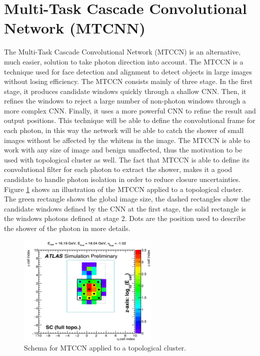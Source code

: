 \section{Multi-Task Cascade Convolutional Network (MTCNN)}

The Multi-Task Cascade Convolutional Network (MTCCN) is an alternative, much easier, solution to take photon direction into account. The MTCCN is a technique used for face detection and alignment to detect objects in large images without losing efficiency. The MTCCN consists mainly of three stage. In the first stage, it produces candidate windows quickly through a shallow CNN. Then,  it  refines the windows to reject a large number of non-photon windows through a more complex CNN. Finally, it uses a more powerful CNN to refine the result and output positions. This technique will be able to define the convolutional frame for each photon, in this way the network will be able to catch the shower of small images without be affected by the whitens in the image. The MTCCN is able to work with any size of image and benign unaffected, thus the motivation to be used with topological cluster as well. The fact that MTCCN is able to define its convolutional filter for each photon to extract the shower, makes it a good candidate to handle photon isolation in order to reduce closure uncertainties. Figure \ref{fig:Adx3:MTCCN} shows an illustration of the MTCCN applied to a topological cluster. The green rectangle shows the global image size, the dashed rectangles show the candidate windows defined by the CNN at the first stage, the solid rectangle is the windows photons defined at stage 2. Dots are the position used to describe the shower of the photon in more details. 
\begin{figure}[ht]
    \centering
    \includegraphics[width=0.6\textwidth]{Adx/Adx3/Img/MTCCN.png}
    \caption{Schema for MTCCN applied to a topological cluster.}
    \label{fig:Adx3:MTCCN}
\end{figure}

